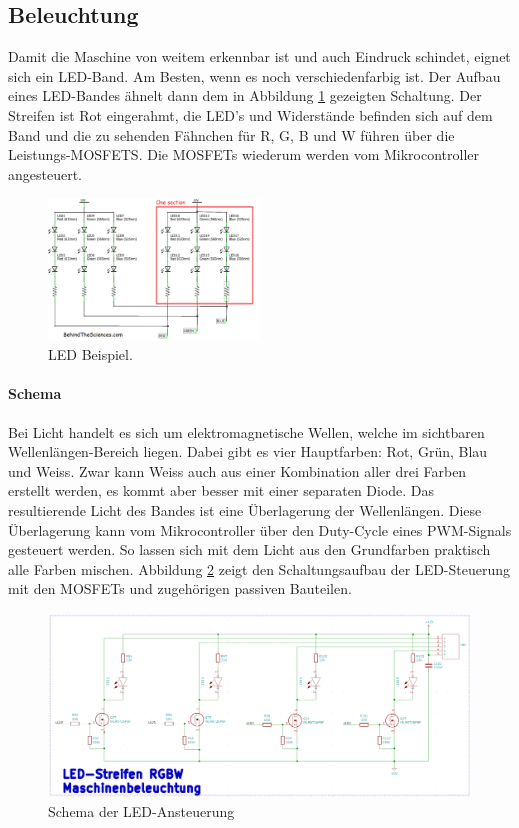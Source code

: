 \subsection{Beleuchtung}
\label{subsec:Beleuchtung_2}

Damit die Maschine von weitem erkennbar ist und auch Eindruck schindet, eignet sich ein LED-Band. Am Besten, wenn es noch verschiedenfarbig ist. Der Aufbau eines LED-Bandes ähnelt dann dem in Abbildung \ref{fig:LED1} gezeigten Schaltung. Der Streifen ist Rot eingerahmt, die LED's und Widerstände befinden sich auf dem Band und die zu sehenden Fähnchen für R, G, B und W führen über die Leistungs-MOSFETS. Die MOSFETs wiederum werden vom Mikrocontroller angesteuert.

\begin{figure}[H]
\center
\includegraphics[width = 0.5\textwidth]{graphics/Schema_LED1}
\caption{LED Beispiel. \cite{behindthesciences_rgb_2017}}
\label{fig:LED1}
\end{figure}

\paragraph{Schema}\mbox{}

Bei Licht handelt es sich um elektromagnetische Wellen, welche im sichtbaren Wellenlängen-Bereich liegen. Dabei gibt es vier Hauptfarben: Rot, Grün, Blau und Weiss. Zwar kann Weiss auch aus einer Kombination aller drei Farben erstellt werden, es kommt aber besser mit einer separaten Diode. Das resultierende Licht des Bandes ist eine Überlagerung der Wellenlängen. Diese Überlagerung kann vom Mikrocontroller über den Duty-Cycle eines PWM-Signals gesteuert werden. So lassen sich mit dem Licht aus den Grundfarben praktisch alle Farben mischen. Abbildung \ref{fig:Schema_LED} zeigt den Schaltungsaufbau der LED-Steuerung mit den MOSFETs und zugehörigen passiven Bauteilen.

\begin{figure}[H]
\center
\includegraphics[width =  \textwidth]{graphics/Schema_LED}
\caption{Schema der LED-Ansteuerung}
\label{fig:Schema_LED}
\end{figure}

